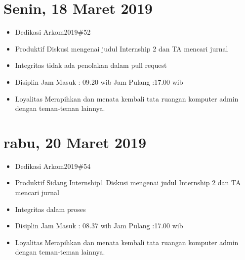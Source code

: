 \section{Senin, 18 Maret 2019}
\begin{itemize}
\item Dedikasi
\subitem Arkom2019\#52
\item Produktif
  \subitem Diskusi mengenai judul Internship 2 dan TA
  \subitem mencari jurnal
\item Integritas
  \subitem tidak ada penolakan dalam pull request
\item Disiplin
  \subitem Jam Masuk : 09.20 wib
  \subitem Jam Pulang :17.00 wib
\item Loyalitas
  \subitem Merapihkan dan menata kembali tata ruangan komputer admin dengan teman-teman lainnya.
\end{itemize}

\section{rabu, 20 Maret 2019}
\begin{itemize}
\item Dedikasi
\subitem Arkom2019\#54
\item Produktif
\subitem Sidang Internship1
  \subitem Diskusi mengenai judul Internship 2 dan TA
  \subitem mencari jurnal
\item Integritas
  \subitem dalam proses
\item Disiplin
  \subitem Jam Masuk : 08.37 wib
  \subitem Jam Pulang :17.00 wib
\item Loyalitas
  \subitem Merapihkan dan menata kembali tata ruangan komputer admin dengan teman-teman lainnya.
\end{itemize}